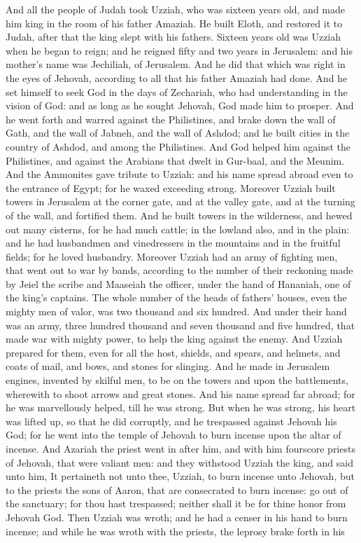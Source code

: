 And all the people of Judah took Uzziah, who was sixteen years old, and made him king in the room of his father Amaziah. He built Eloth, and restored it to Judah, after that the king slept with his fathers. Sixteen years old was Uzziah when he began to reign; and he reigned fifty and two years in Jerusalem: and his mother’s name was Jechiliah, of Jerusalem. And he did that which was right in the eyes of Jehovah, according to all that his father Amaziah had done. And he set himself to seek God in the days of Zechariah, who had understanding in the vision of God: and as long as he sought Jehovah, God made him to prosper.  And he went forth and warred against the Philistines, and brake down the wall of Gath, and the wall of Jabneh, and the wall of Ashdod; and he built cities in the country of Ashdod, and among the Philistines. And God helped him against the Philistines, and against the Arabians that dwelt in Gur-baal, and the Meunim. And the Ammonites gave tribute to Uzziah: and his name spread abroad even to the entrance of Egypt; for he waxed exceeding strong. Moreover Uzziah built towers in Jerusalem at the corner gate, and at the valley gate, and at the turning of the wall, and fortified them. And he built towers in the wilderness, and hewed out many cisterns, for he had much cattle; in the lowland also, and in the plain: and he had husbandmen and vinedressers in the mountains and in the fruitful fields; for he loved husbandry. Moreover Uzziah had an army of fighting men, that went out to war by bands, according to the number of their reckoning made by Jeiel the scribe and Maaseiah the officer, under the hand of Hananiah, one of the king’s captains. The whole number of the heads of fathers’ houses, even the mighty men of valor, was two thousand and six hundred. And under their hand was an army, three hundred thousand and seven thousand and five hundred, that made war with mighty power, to help the king against the enemy. And Uzziah prepared for them, even for all the host, shields, and spears, and helmets, and coats of mail, and bows, and stones for slinging. And he made in Jerusalem engines, invented by skilful men, to be on the towers and upon the battlements, wherewith to shoot arrows and great stones. And his name spread far abroad; for he was marvellously helped, till he was strong.  But when he was strong, his heart was lifted up, so that he did corruptly, and he trespassed against Jehovah his God; for he went into the temple of Jehovah to burn incense upon the altar of incense. And Azariah the priest went in after him, and with him fourscore priests of Jehovah, that were valiant men: and they withstood Uzziah the king, and said unto him, It pertaineth not unto thee, Uzziah, to burn incense unto Jehovah, but to the priests the sons of Aaron, that are consecrated to burn incense: go out of the sanctuary; for thou hast trespassed; neither shall it be for thine honor from Jehovah God. Then Uzziah was wroth; and he had a censer in his hand to burn incense; and while he was wroth with the priests, the leprosy brake forth in his 